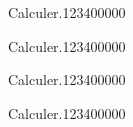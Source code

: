 \begin{pageAuto} 

 

 
 \begin{ExoAuto}{Calculer.}{1234}{0}{0}{0}{0}{0}

\end{ExoAuto}
 
 
\begin{ExoAuto}{Calculer.}{1234}{0}{0}{0}{0}{0}

\end{ExoAuto}
 
 
\begin{ExoAuto}{Calculer.}{1234}{0}{0}{0}{0}{0}

\end{ExoAuto}
 
 
\begin{ExoAuto}{Calculer.}{1234}{0}{0}{0}{0}{0}

\end{ExoAuto} 
 
  
\end{pageAuto}
\begin{pageBrouillon} 
 

\end{pageBrouillon}
